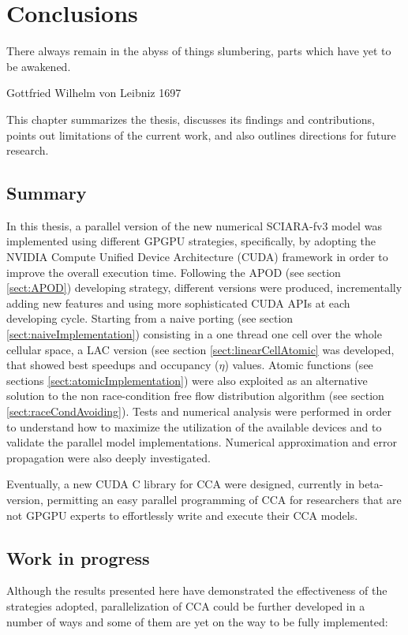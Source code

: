 

\chapter{Conclusions}
\epigraphfontsize{\small\itshape}
\setlength\epigraphwidth{8cm}
\setlength\epigraphrule{0pt}

\epigraphfontsize{\small\itshape}
\epigraph{There always remain in the abyss of things slumbering, parts
which have yet to be awakened.}{Gottfried Wilhelm von Leibniz 1697}


This chapter summarizes the thesis, discusses its findings and contributions,
 points out limitations of the current work, and also outlines directions for future research. 

\section{Summary}
In this thesis, a parallel version of the new numerical SCIARA-fv3\cite{Spataro2010} model was implemented
using different GPGPU strategies,
specifically, by adopting the NVIDIA Compute Unified Device Architecture
(CUDA)\cite{NvidiaprogGuide} framework in order to improve the overall execution time.
Following the APOD (see section \ref{sect:APOD}) developing strategy, different
versions were produced, incrementally adding new features and using more
sophisticated CUDA APIs at each developing cycle.
Starting from a naive porting (see section \ref{sect:naiveImplementation}) consisting in a one thread one cell over
the whole cellular space, a LAC version (see section \ref{sect:linearCellAtomic} was developed, that
showed best speedups and occupancy (\(\eta\)) values. Atomic functions (see
sections \ref{sect:atomicImplementation}) were also exploited as
an alternative solution to the non race-condition free flow distribution algorithm
(see section \ref{sect:raceCondAvoiding}).
Tests and numerical analysis were performed in order to understand how to
 maximize the utilization of the available devices and to validate the parallel model implementations. 
Numerical approximation and error propagation were also deeply investigated.

Eventually, a new CUDA C library for CCA were designed, currently in beta-version, permitting an
easy parallel programming of CCA for researchers that are not GPGPU experts to
effortlessly write and execute their CCA models.

\section{Work in progress}
Although the results presented here have demonstrated the effectiveness of the
strategies adopted, parallelization of CCA could be further developed in a
number of ways and some of them are yet on the way to be fully implemented:

